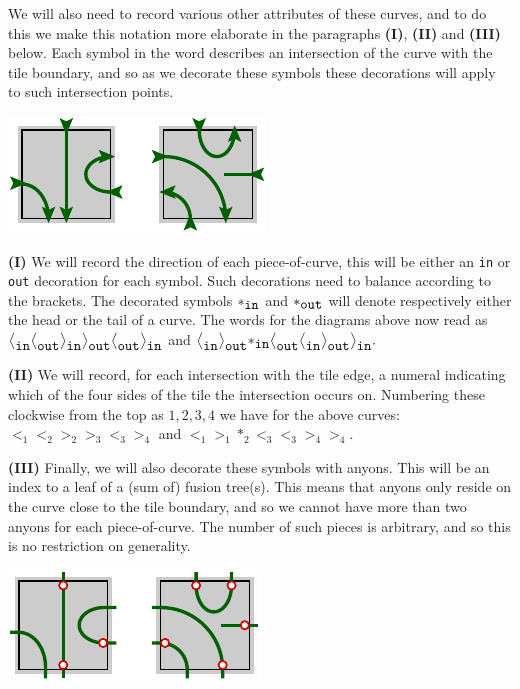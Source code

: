 \documentclass[aps, prl, letterpaper, twocolumn, superscriptaddress, notitlepage, 10pt]{revtex4-1}
\begin{document}
We will also need to record
various other attributes of these curves,
and to do this we make this notation more elaborate
in the paragraphs {\bf (I)}, {\bf(II)} and {\bf(III)} below.
Each symbol in the word describes an intersection of
the curve with the tile boundary,
and so as we decorate these symbols these decorations will
apply to such intersection points.

\begin{center}
\includegraphics[]{pic-cells-1.pdf}
\end{center}

{\bf (I)} We will record the direction of each piece-of-curve,
this will be either an {\tt in} or {\tt out} decoration for each symbol.
Such decorations need to balance according to the brackets.
The decorated symbols $*_{\mbox{\tt in}}$ and 
$*_{\mbox{\tt out}}$ 
will denote respectively either
the head or the tail of a curve.
The words for the diagrams above now read as
$ \bigl<_{\mbox{\tt in}}\bigl<_{\mbox{\tt out}}\bigr>_{\mbox{\tt in}}
    \bigr>_{\mbox{\tt out}}\bigl<_{\mbox{\tt out}}\bigr>_{\mbox{\tt in}}$
and
$ \bigl<_{\mbox{\tt in}}\bigl>_{\mbox{\tt out}}*_{\mbox{\tt in}}
    \bigr<_{\mbox{\tt out}}
    \bigr<_{\mbox{\tt in}}\bigl>_{\mbox{\tt out}}\bigr>_{\mbox{\tt in}}.
$

{\bf (II)} We will record,
for each intersection with the tile edge, 
a numeral indicating which of the four
sides of the tile the
intersection occurs on.
Numbering these clockwise from the top as $1, 2, 3, 4$ we have for the above curves: 
$\bigl<_1\bigl<_2\bigr>_2\bigr>_3\bigl<_3\bigr>_4$ 
and $\bigl<_1\bigr>_1*_2\bigl<_3\bigl<_3\bigr>_4\bigr>_4.$

{\bf (III)} Finally, we will also decorate these symbols with anyons.
This will be an index to a leaf of a (sum of) fusion tree(s).
This means that anyons only reside on the curve close
to the tile boundary,
and so we cannot have more than two anyons
for each piece-of-curve. 
The number of such pieces is arbitrary, and so this
is no restriction on generality.

\begin{center}
\includegraphics[]{pic-cells-2.pdf}
\end{center}
\end{document}
